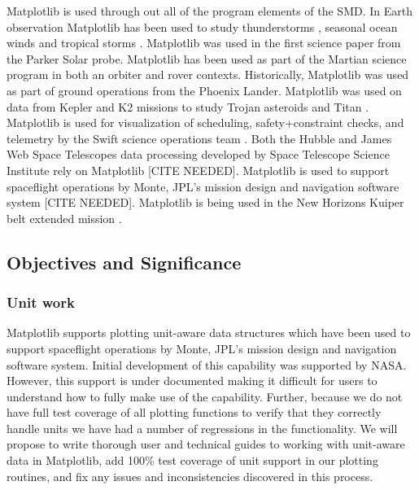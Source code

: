 \documentclass[12pt]{article}
\numberwithin{page}{section}
\begin{document}
Matplotlib is used through out all of the program elements of the SMD.
In Earth observation Matplotlib has been used to study thunderstorms
\cite{https://doi.org/10.1002/2016JD025299,https://doi.org/10.1029/2019JD030874},
seasonal ocean winds \cite{https://doi.org/10.1002/2017JD027516} and
tropical storms \cite{Lang_2020}.  Matplotlib was used in the first
science paper from the Parker Solar probe\cite{Bale2019}.  Matplotlib
has been used as part of the Martian science program in both an
orbiter \cite{https://doi.org/10.1029/2019JE006188} and
rover\cite{https://doi.org/10.1002/2016EA000219} contexts.
Historically, Matplotlib was used as part of ground operations from
the Phoenix Lander.  Matplotlib was used on data from Kepler and K2
missions to study Trojan asteroids\cite{Nixon_2019} and Titan
\cite{Ryan_2017,2019PASP..131h4505P}.
Matplotlib is used for visualization of scheduling, safety+constraint checks, and telemetry by the Swift science operations team \cite{swift_ops,2020ApJ...900...35T}.
Both the Hubble and James Web Space Telescopes data processing
developed by Space Telescope Science Institute rely on Matplotlib [CITE NEEDED].
Matplotlib is used to support spaceflight operations by Monte, JPL's
mission design and navigation software system [CITE NEEDED].
Matplotlib is being used in the New Horizons Kuiper belt extended mission \cite{Porter_2018}.




\subsection{Objectives and Significance}
\subsubsection{Unit work}
Matplotlib supports plotting unit-aware data structures which have
been used to support spaceflight operations by Monte, JPL's mission
design and navigation software system. Initial development of this
capability was supported by NASA. However, this support is under
documented making it difficult for users to understand how to fully
make use of the capability. Further, because we do not have full test
coverage of all plotting functions to verify that they correctly
handle units we have had a number of regressions in the
functionality. We will propose to write thorough user and technical
guides to working with unit-aware data in Matplotlib, add 100\% test
coverage of unit support in our plotting routines, and fix any issues
and inconsistencies discovered in this process.
\end{document}
